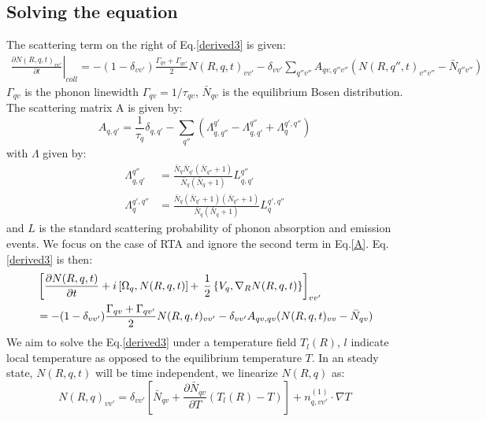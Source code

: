 \documentclass{article}
\begin{document}
\subsection{Solving the equation}
The scattering term on the right of Eq.\ref{derived3} is given:
\begin{align}
    \left. \frac{\partial N(R,q,t)_{vv'} }{\partial t} \right|_{coll} 
    = - (1-\delta_{vv'}) \frac{\Gamma_{qv} + \Gamma_{qv'}}{2} N(R,q,t)_{vv'} 
      - \delta_{vv'} \sum_{q''v''} A_{qv,q''v''}  (N(R,q'',t)_{v''v''} - \bar{N}_{q''v''} )
\end{align}
$\Gamma_{qv}$ is the phonon linewidth $\Gamma_{qv} = 1 / \tau_{qv}$, 
$\bar{N}_{qv}$ is the equilibrium Bosen distribution. The scattering matrix A is given by:
\begin{equation}
    A_{q,q'} = \frac{1}{\tau_{q}} \delta_{q,q'} 
            - \sum_{q''} \left( \Lambda_{q,q''}^{q'} -  \Lambda_{q,q'}^{q''} + \Lambda^{q',q''}_{q} \right) \label{A}
\end{equation}
with $\Lambda$ given by:
\begin{align}
    \Lambda_{q,q'}^{q''} &= \frac{\bar{N}_{q} \bar{N}_{q'} (\bar{N}_{q''} + 1)}{\bar{N}_{q} (\bar{N}_{q} + 1)} L_{q,q'}^{q''} \\
    \Lambda^{q',q''}_{q} &= \frac{\bar{N}_{q} (\bar{N}_{q'}+1) (\bar{N}_{q''} + 1)}{\bar{N}_{q} (\bar{N}_{q} + 1)} L^{q',q''}_{q} 
\end{align}
and $L$ is the standard scattering probability of phonon absorption and emission events.
We focus on the case of RTA and ignore the second term in Eq.\ref{A}. Eq.\ref{derived3} is then:
\begin{align}
    &\left[ \frac{\partial N(R,q,t)}{\partial t} + i \left[ \Omega_{q},N(R,q,t) \right] + \right.
      \left.  \frac{1}{2} \left\{ V_{q}, \nabla_R N(R,q,t) \right\} \right]_{vv'} \notag \\
        &=  - (1-\delta_{vv'}) \frac{\Gamma_{qv} + \Gamma_{qv'}}{2} N(R,q,t)_{vv'} 
           - \delta_{vv'} A_{qv,qv} (N(R,q,t)_{vv} - \bar{N}_{qv} ) \label{final}
\end{align}
We aim to solve the Eq.\ref{derived3} under a temperature field $T_l(R)$, $l$ indicate local temperature 
as opposed to the equilibrium temperature $T$. In an steady state, $N(R,q,t)$ will be time independent, we 
linearize $N(R,q)$ as:
\begin{equation}
    N(R,q)_{vv'} = \delta_{vv'} \left[ \bar{N}_{qv} + \frac{\partial \bar{N}_{qv}}{\partial T} (T_l(R)-T) \right] + n^{(1)}_{q,vv'} \cdot \nabla T \label{linear}
\end{equation}
\end{document}
